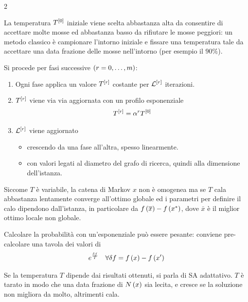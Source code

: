 \documentclass[\main/main.tex]{subfiles}
\begin{document}
\begin{multicols}{2}
\begin{analysis}
La temperatura \(T^{\left[0\right]}\) iniziale viene scelta abbastanza alta da consentire di accettare molte mosse ed abbastanza basso da rifiutare le mosse peggiori: un metodo classico è campionare l'intorno iniziale e fissare una temperatura tale da accettare una data frazione delle mosse nell'intorno (per esempio il \(90\%\)).
\end{analysis}
\begin{observation}
Si procede per fasi successive \(\left(r=0, \ldots, m\right)\):
\begin{enumerate}
    \item Ogni fase applica un valore \(T^{\left[r\right]}\) costante per \(\mathcal{L}^{\left[r\right]}\) iterazioni.
    \item \(T^{\left[r\right]}\) viene via via aggiornata con un profilo esponenziale
    \[
        T^{\left[r\right]} = \alpha^r T^{\left[0\right]}
    \]
    \item \(\mathcal{L}^{\left[r\right]}\) viene aggiornato
    \begin{itemize}
        \item crescendo da una fase all'altra, spesso linearmente.
        \item con valori legati al diametro del grafo di ricerca, quindi alla dimensione dell'istanza.
    \end{itemize}
\end{enumerate}
Siccome \(T\) è variabile, la catena di Markov \(x\) non è omogenea ma se \(T\) cala abbastanza lentamente converge all'ottimo globale ed i parametri per definire il calo dipendono dall'istanza, in particolare da \(f\left(\overline{x}\right) - f\left(x^*\right)\), dove \(\bar{x}\) è il miglior ottimo locale non globale.
\end{observation}
\begin{observation}
    Calcolare la probabilità con un'esponenziale può essere pesante: conviene pre-calcolare una tavola dei valori di 
    \[
    e^\frac{\delta f}{T} \quad \forall \delta f = f\left(x\right) - f\left(x'\right)
    \]
\end{observation}
\begin{observation}
    Se la temperatura \(T\) dipende dai risultati ottenuti, si parla di SA adattativo. \(T\) è tarato in modo che una data frazione di \(N\left(x\right)\) sia lecita, e cresce se la soluzione non migliora da molto, altrimenti cala.
\end{observation}
\end{multicols}
\end{document}
